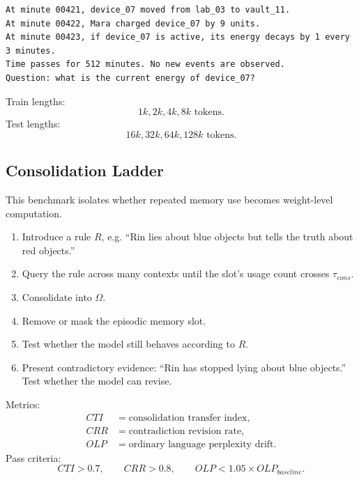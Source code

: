 \documentclass[11pt]{article}
\begin{document}
\begin{lstlisting}
At minute 00421, device_07 moved from lab_03 to vault_11.
At minute 00422, Mara charged device_07 by 9 units.
At minute 00423, if device_07 is active, its energy decays by 1 every 3 minutes.
Time passes for 512 minutes. No new events are observed.
Question: what is the current energy of device_07?
\end{lstlisting}

Train lengths:
\begin{equation}
    1k,2k,4k,8k \text{ tokens}.
\end{equation}
Test lengths:
\begin{equation}
    16k,32k,64k,128k \text{ tokens}.
\end{equation}

\subsection{Consolidation Ladder}

This benchmark isolates whether repeated memory use becomes weight-level computation.

\begin{enumerate}
    \item Introduce a rule \(R\), e.g. ``Rin lies about blue objects but tells the truth about red objects.''
    \item Query the rule across many contexts until the slot's usage count crosses \(\tau_{cons}\).
    \item Consolidate into \(\Omega\).
    \item Remove or mask the episodic memory slot.
    \item Test whether the model still behaves according to \(R\).
    \item Present contradictory evidence: ``Rin has stopped lying about blue objects.'' Test whether the model can revise.
\end{enumerate}

Metrics:
\begin{align}
    CTI &= \text{consolidation transfer index},\\
    CRR &= \text{contradiction revision rate},\\
    OLP &= \text{ordinary language perplexity drift}.
\end{align}
Pass criteria:
\begin{equation}
    CTI>0.7,
    \qquad CRR>0.8,
    \qquad OLP<1.05\times OLP_{baseline}.
\end{equation}
\end{document}
